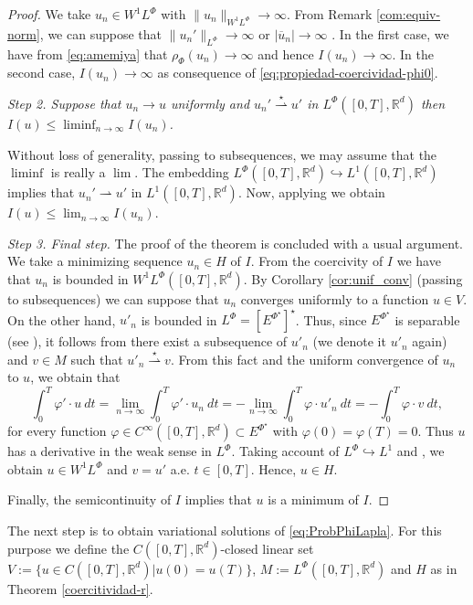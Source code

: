 \documentclass[twoside]{article}
\theoremstyle{remark}
\newcommand{\orlnor}{\|_{L^{\Phi}}}
\newcommand{\lphi}{L^{\Phi}}
\newcommand{\wphi}{W^{1}\lphi}
\newcommand{\sobnor}{\|_{W^{1}\lphi}}
\newcommand{\rr}{\mathbb{R}}
\renewcommand{\leq}{\leqslant}
\newcommand{\epsi}{E^{\Phi^{\star}}}
\begin{document}
\begin{proof}
We take $u_n\in\wphi$ with $\|u_n\sobnor\to\infty$. From Remark \ref{com:equiv-norm}, we can suppose that $\|u_n'\orlnor \to \infty$ or $|\overline{u}_n|\to \infty$ . In the first case, we have from \eqref{eq:amemiya} that $\rho_\Phi(u_n)\to\infty$ and hence  $I(u_n)\to\infty$. In the second case,  $I(u_n)\to\infty$ as consequence of \eqref{eq:propiedad-coercividad-phi0}.





\emph{Step 2. Suppose that $u_n\to u$ uniformly and $u_n'\overset{\star}{\rightharpoonup} u'$ in $\lphi([0,T],\rr^d)$ then
$
I(u)\leq\liminf_{n\to\infty}I(u_n)
$.
}  


  Without loss of generality, passing to subsequences, we may assume that the $\liminf$ is really a $\lim$. The embedding  $\lphi([0,T],\rr^d)\hookrightarrow L^1([0,T],\rr^d)$ implies that  $u_n'\rightharpoonup u' $ in $ L^1([0,T],\rr^d)$.  Now, applying \cite[Th. 3.6]{buttazzo1998one} we obtain $I(u)\leq \lim_{n\to\infty}I(u_n)$.

\emph{Step 3. Final step.}
The proof of the theorem is concluded with a usual argument. We take a minimizing sequence $u_n \in H$ of $I$. 
From the coercivity of $I$ we have that $u_n$ is bounded in $\wphi([0,T],\rr^d)$. By Corollary \ref{cor:unif_conv}  (passing to subsequences) we can suppose that $u_n$ converges uniformly to a function $u\in V$. 
On the other hand, $u'_n$ is bounded in $\lphi=\left[\epsi\right]^\star$. Thus,  
since $E^{\Phi^{\star}}$ is separable (see \cite[Thm. 6.3]{Orliczvectorial2005}), it follows from \cite[Cor. 3.30]{brezis2010functional} 
there exist a subsequence of $u'_n$ (we denote it $u'_n$ again) and $v \in M$ such that $u'_n\overset{\star}{\rightharpoonup}v$. From this fact and the uniform convergence of $u_n$ to $u$, we obtain that
\[
\int_0^T\varphi'\cdot u\ dt=\lim_{n\to\infty}\int_0^T\varphi'\cdot u_n \ dt=
-\lim_{n\to\infty}\int_0^T\varphi\cdot u'_n\ dt=-\int_0^T\varphi\cdot v\ dt,
\]
for every function $\varphi\in C^{\infty}([0,T],\rr^d)\subset\epsi$ with $\varphi(0)= \varphi(T)=0$.
Thus $u$ has a  derivative in the weak sense in $\lphi$. Taking account of 
$\lphi \hookrightarrow L^1$ and \cite[Thms. 2.3 and 2.17 ]{buttazzo1998one}, 
we obtain $u\in \wphi$ and $v=u'$ a.e. $t\in [0,T]$.
Hence, $u \in H$. 

Finally, the semicontinuity of $I$ implies that $u$ is a minimum of $I$.
\end{proof}



The next step is to obtain variational solutions of  \eqref{eq:ProbPhiLapla}. For this purpose we define the $C([0,T],\rr^d)$-closed linear set $V:=\{u\in C([0,T],\rr^d)|u(0)=u(T)\}$, $M:=\lphi([0,T],\rr^d)$ and $H$ as in Theorem \ref{coercitividad-r}.
\end{document}
